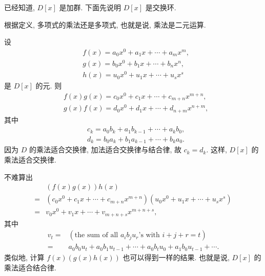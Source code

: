 \begin{pf}
    已经知道, $D[x]$ 是加群. 下面先说明 $D[x]$ 是交换环.

    根据定义, 多项式的乘法还是多项式, 也就是说, 乘法是二元运算.

    设
    \begin{align*}
         & f(x) = a_0 x^0 + a_1 x + \cdots + a_m x^m, \\
         & g(x) = b_0 x^0 + b_1 x + \cdots + b_n x^n, \\
         & h(x) = u_0 x^0 + u_1 x + \cdots + u_s x^s
    \end{align*}
    是 $D[x]$ 的元. 则
    \begin{align*}
         & f(x) g(x) = c_0 x^0 + c_1 x + \cdots + c_{m+n} x^{m+n}, \\
         & g(x) f(x) = d_0 x^0 + d_1 x + \cdots + d_{n+m} x^{n+m},
    \end{align*}
    其中
    \begin{align*}
         & c_k = a_0 b_k + a_1 b_{k-1} + \cdots + a_k b_0, \\
         & d_k = b_0 a_k + b_1 a_{k-1} + \cdots + b_k a_0.
    \end{align*}
    因为 $D$ 的乘法适合交换律, 加法适合交换律与结合律, 故 $c_k = d_k$. 这样, $D[x]$ 的乘法适合交换律.

    不难算出
    \begin{align*}
             & (f(x) g(x)) h(x)                                                                  \\
        = {} & (c_0 x^0 + c_1 x + \cdots + c_{m+n} x^{m+n}) (u_0 x^0 + u_1 x + \cdots + u_s x^s) \\
        = {} & v_0 x^0 + v_1 x + \cdots + v_{m+n+s} x^{m+n+s},
    \end{align*}
    其中
    \begin{align*}
        v_t
        = {} & (\text{the sum of all $a_i b_j u_r$'s with $i+j+r=t$})                           \\
        = {} & a_0 b_0 u_t + a_0 b_1 u_{t-1} + \cdots + a_0 b_t u_0 + a_1 b_0 u_{t-1} + \cdots.
    \end{align*}
    类似地, 计算 $f(x) (g(x) h(x))$ 也可以得到一样的结果. 也就是说, $D[x]$ 的乘法适合结合律.


\end{pf}
